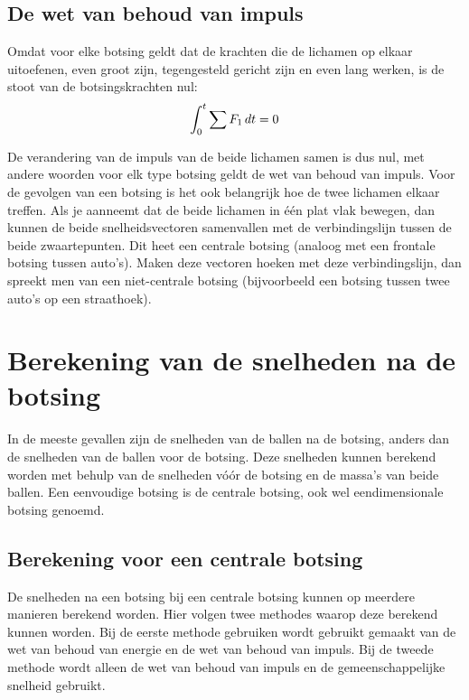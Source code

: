 \documentclass[12pt,a4paper]{article}
\begin{document}
	\subsection{De wet van behoud van impuls}
	Omdat voor elke botsing geldt dat de krachten die de lichamen op elkaar uitoefenen, even groot zijn, tegengesteld gericht zijn en even lang werken, is de stoot van de botsingskrachten nul:
	\begin{equation}
		  \int_0^t \sum F_1\,dt = 0\\
	\end{equation}

	De verandering van de impuls van de beide lichamen samen is dus nul, met andere woorden voor elk type botsing geldt de wet van behoud van impuls.
	Voor de gevolgen van een botsing is het ook belangrijk hoe de twee lichamen elkaar treffen. Als je aanneemt dat de beide lichamen in \'{e}\'{e}n plat vlak bewegen, dan kunnen de beide snelheidsvectoren samenvallen met de verbindingslijn tussen de beide zwaartepunten. Dit heet een centrale botsing (analoog met een frontale botsing tussen auto's). Maken deze vectoren hoeken met deze verbindingslijn, dan spreekt men van een niet-centrale botsing (bijvoorbeeld een botsing tussen twee auto's op een straathoek).
	
	\newpage
	
	\section{Berekening van de snelheden na de botsing}
	In de meeste gevallen zijn de snelheden van de ballen na de botsing, anders dan de snelheden van de ballen voor de botsing. Deze snelheden kunnen berekend worden met behulp van de snelheden v\'{o}\'{o}r de botsing en de massa's van beide ballen. Een eenvoudige botsing is de centrale botsing, ook wel eendimensionale botsing genoemd.

	\subsection{Berekening voor een centrale botsing}
	De snelheden na een botsing bij een centrale botsing kunnen op meerdere manieren berekend worden. Hier volgen twee methodes waarop deze berekend kunnen worden. Bij  de eerste methode gebruiken wordt gebruikt gemaakt van de wet van behoud van energie en de wet van behoud van impuls. Bij de tweede methode wordt alleen de wet van behoud van impuls en de gemeenschappelijke snelheid gebruikt.
\end{document}
